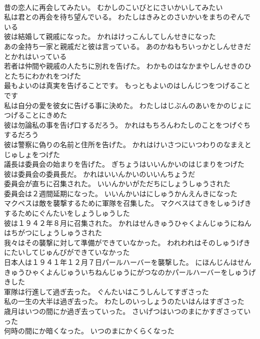 \documentclass[8pt]{extreport}
\begin{document}
\begin{CJK}{UTF8}{min}
\\	昔の恋人に再会してみたい。	むかしのこいびとにさいかいしてみたい 
\\	私は君との再会を待ち望んでいる。	わたしはきみとのさいかいをまちのぞんでいる 
\\	彼は結婚して親戚になった。	かれはけっこんしてしんせきになった 
\\	あの金持ち一家と親戚だと彼は言っている。	あのかねもちいっかとしんせきだとかれはいっている 
\\	若者は仲間や親戚の人たちに別れを告げた。	わかものはなかまやしんせきのひとたちにわかれをつげた 
\\	最もよいのは真実を告げることです。	もっともよいのはしんじつをつげることです 
\\	私は自分の愛を彼女に告げる事に決めた。	わたしはじぶんのあいをかのじょにつげることにきめた 
\\	彼は勿論私の事を告げ口するだろう。	かれはもちろんわたしのことをつげぐちするだろう 
\\	彼は警察に偽りの名前と住所を告げた。	かれはけいさつにいつわりのなまえとじゅしょをつげた 
\\	議長は委員会の始まりを告げた。	ぎちょうはいいんかいのはじまりをつげた 
\\	彼は委員会の委員長だ。	かれはいいんかいのいいんちょうだ 
\\	委員会が直ちに召集された。	いいんかいがただちにしょうしゅうされた 
\\	委員会は２週間延期になった。	いいんかいはにしゅうかんえんきになった 
\\	マクベスは敵を襲撃するために軍隊を召集した。	マクベスはてきをしゅうげきするためにぐんたいをしょうしゅうした 
\\	彼は１９４２年８月に召集された。	かれはせんきゅうひゃくよんじゅうにねんはちがつにしょうしゅうされた 
\\	我々はその襲撃に対して準備ができていなかった。	われわれはそのしゅうげきにたいしてじゅんびができていなかった 
\\	日本人は１９４１年１２月７日パールハーバーを襲撃した。	にほんじんはせんきゅうひゃくよんじゅういちねんじゅうにがつなのかパールハーバーをしゅうげきした 
\\	軍隊は行進して過ぎ去った。	ぐんたいはこうしんしてすぎさった 
\\	私の一生の大半は過ぎ去った。	わたしのいっしょうのたいはんはすぎさった 
\\	歳月はいつの間にか過ぎ去っていった。	さいげつはいつのまにかすぎさっていった 
\\	何時の間にか暗くなった。	いつのまにかくらくなった 

\end{CJK}
\end{document}
